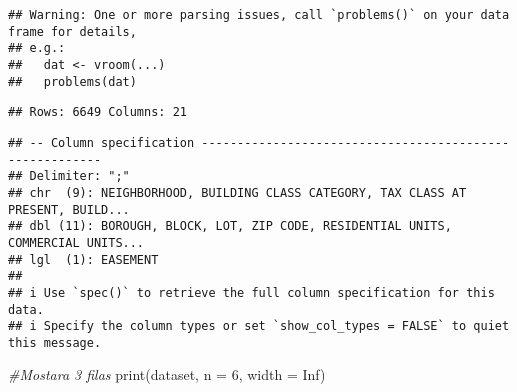 \documentclass[
]{article}
\newenvironment{Shaded}{\begin{snugshade}}{\end{snugshade}}
\newcommand{\AttributeTok}[1]{\textcolor[rgb]{0.77,0.63,0.00}{#1}}
\newcommand{\CommentTok}[1]{\textcolor[rgb]{0.56,0.35,0.01}{\textit{#1}}}
\newcommand{\ConstantTok}[1]{\textcolor[rgb]{0.00,0.00,0.00}{#1}}
\newcommand{\DecValTok}[1]{\textcolor[rgb]{0.00,0.00,0.81}{#1}}
\newcommand{\FunctionTok}[1]{\textcolor[rgb]{0.00,0.00,0.00}{#1}}
\newcommand{\NormalTok}[1]{#1}
\begin{document}
\begin{verbatim}
## Warning: One or more parsing issues, call `problems()` on your data frame for details,
## e.g.:
##   dat <- vroom(...)
##   problems(dat)
\end{verbatim}

\begin{verbatim}
## Rows: 6649 Columns: 21
\end{verbatim}

\begin{verbatim}
## -- Column specification --------------------------------------------------------
## Delimiter: ";"
## chr  (9): NEIGHBORHOOD, BUILDING CLASS CATEGORY, TAX CLASS AT PRESENT, BUILD...
## dbl (11): BOROUGH, BLOCK, LOT, ZIP CODE, RESIDENTIAL UNITS, COMMERCIAL UNITS...
## lgl  (1): EASEMENT
## 
## i Use `spec()` to retrieve the full column specification for this data.
## i Specify the column types or set `show_col_types = FALSE` to quiet this message.
\end{verbatim}

\begin{Shaded}
\begin{Highlighting}[]
\CommentTok{\#Mostara 3 filas}
\FunctionTok{print}\NormalTok{(dataset, }\AttributeTok{n =} \DecValTok{6}\NormalTok{, }\AttributeTok{width =} \ConstantTok{Inf}\NormalTok{)}
\end{Highlighting}
\end{Shaded}
\end{document}
